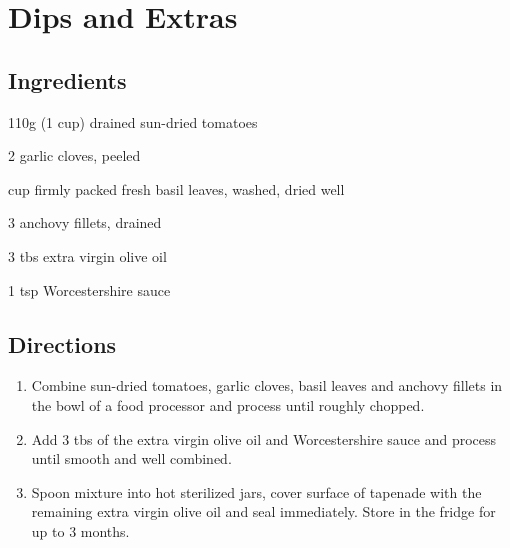 \chapter{Dips and Extras}

\section*{Ingredients}
\begin{ingredients-list}
	\item 110g (1 cup) drained sun-dried tomatoes
	\item 2 garlic cloves, peeled
	\item {} cup firmly packed fresh basil leaves, washed, dried well
	\item 3 anchovy fillets, drained
	\item 3 tbs extra virgin olive oil
	\item 1 tsp Worcestershire sauce 
\end{ingredients-list}

\section*{Directions}
\begin{enumerate}
\item Combine sun-dried tomatoes, garlic cloves, basil leaves and anchovy fillets in the bowl of a food processor and process until roughly chopped.
\item Add 3 tbs of the extra virgin olive oil and Worcestershire sauce and process until smooth and well combined.
\item Spoon mixture into hot sterilized jars, cover surface of tapenade with the remaining extra virgin olive oil and seal immediately. Store in the fridge for up to 3 months.
\end{enumerate}

\bigskip
